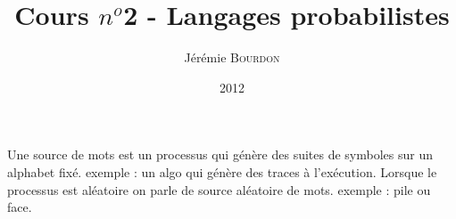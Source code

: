 \documentclass[a4paper,11pt]{article}
\begin{document}
\title{Cours $n^o$2 - Langages probabilistes}
\author{Jérémie \textsc{Bourdon}}
\date{2012}
\maketitle
{}
 \p Une source de mots est un processus qui génère des suites de symboles sur un
 alphabet fixé.
 \p exemple : un algo qui génère des traces à l'exécution.
 \p Lorsque le processus est aléatoire on parle de source aléatoire de mots.
 \p exemple : pile ou face.
\end{document}
